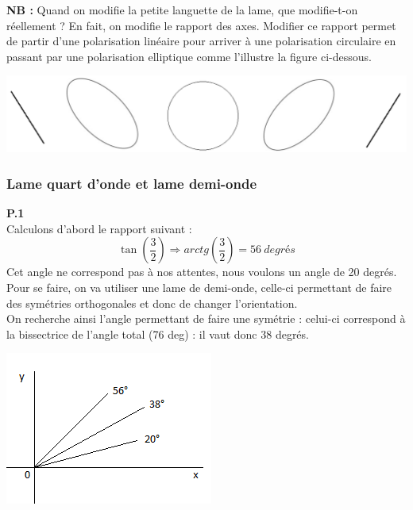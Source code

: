 \documentclass	[11pt, a4paper, openany]{book}
\begin{document}
		\textbf{NB :} Quand on modifie la petite languette de la lame, que modifie-t-on réellement ? En fait, on modifie le rapport des axes. Modifier ce rapport permet de partir d'une polarisation linéaire pour arriver à une polarisation circulaire en passant par une polarisation elliptique comme l'illustre la figure ci-dessous.
		\begin{center}
			\includegraphics[scale=0.5]{labo/image5.png}
		\end{center}
		
		\subsubsection*{Lame quart d'onde et lame demi-onde}
		\textbf{P.1}\\
		Calculons d'abord le rapport suivant : 
		\begin{equation}
			\tan\left(\frac{3}{2}\right) \Rightarrow arctg\left(\frac{3}{2}\right) = 56\ degrés
		\end{equation}
		Cet angle ne correspond pas à nos attentes, nous voulons un angle de 20 degrés. Pour se faire, on va utiliser une lame de demi-onde, celle-ci permettant de faire des symétries orthogonales et donc de changer l'orientation.\\
		On recherche ainsi l'angle permettant de faire une symétrie : celui-ci correspond à la bissectrice de l'angle total (76 deg) : il vaut donc 38 degrés.
		\begin{center}
			\includegraphics[scale=0.8]{labo/image6.png}
		\end{center}
		\ \\
		
\end{document}
